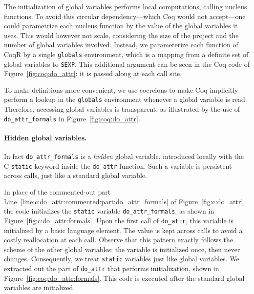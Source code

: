 \documentclass[
    sigplan,
    10pt,
    review, %
    natbib=false %
 ]{acmart}
\newcommand\mb[1]{\todo[color=purple!20,size=\scriptsize]{#1}}
\newcommand\et[1]{\todo[color=blue!20,size=\scriptsize]{#1}}
\newcommand\CoqR{CoqR}
\newcommand\changed[1]{{\color{blue} #1}}
\begin{document}
%
\changed{The initialization of global variables performs local computations, calling nucleus functions.}
To avoid this circular dependency---which Coq would not accept---one could parametrize each nucleus function by the value of the global variables it uses.
This would however not scale, considering the size of the project and the number of global variables involved.
%
Instead, we parameterize each function of \CoqR{} by a single \texttt{globals} environment, which is a mapping from a definite set of global variables to \texttt{SEXP}. This additional argument can be seen in the Coq code of Figure~\ref{fig:coq:do_attr}: it is passed along at each call site.

To make definitions more convenient, we use coercions to make Coq implicitly perform a lookup in the \texttt{globals} environment whenever a global variable is read. Therefore, accessing global variables is transparent, as illustrated by the use of \texttt{do_attr_formals} in Figure~\ref{fig:coq:do_attr}.

\paragraph{Hidden global variables.}
In fact \texttt{do_attr_formals} is a {\em hidden} global variable, introduced locally with the C \texttt{static} keyword inside the \texttt{do_attr} function.
Such a variable is persistent across calls, just like a standard global variable.

In place of the commented-out part Line~\ref{line:c:do_attr:commented:part:do_attr_formals} of Figure~\ref{fig:c:do_attr},
the code initializes the \texttt{static} variable \texttt{do_attr_formals},
as shown in Figure~\ref{fig:c:do_attr:formals}.
Upon the first call of \texttt{do_attr}, this variable is initialized by a basic language element.
The value is kept across calls to avoid a costly reallocation at each call.
%
Observe that this pattern exactly follows the scheme of the other global variables:
the variable is initialized once, then never changes.
Consequently, we treat \texttt{static} variables just like global variables.
We extracted out the part of \texttt{do_attr} that performs initialization, shown in Figure~\ref{fig:coq:do_attr:formals}.
This code is executed after the standard global variables are initialized.
\end{document}
